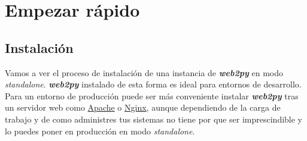 \documentclass[
  12pt,
  spanish,
]{article}
\begin{document}
\hypertarget{empezar-ruxe1pido}{%
\section{Empezar rápido}\label{empezar-ruxe1pido}}

\hypertarget{instalaciuxf3n}{%
\subsection{Instalación}\label{instalaciuxf3n}}

Vamos a ver el proceso de instalación de una instancia de
\textbf{\emph{web2py}} en modo \emph{standalone}. \textbf{\emph{web2py}}
instalado de esta forma es ideal para entornos de desarrollo. Para un
entorno de producción puede ser más conveniente instalar
\textbf{\emph{web2py}} tras un servidor web como
\href{https://www.apache.org/}{Apache} o
\href{https://www.nginx.com/}{Nginx}, aunque dependiendo de la carga de
trabajo y de como administres tus sistemas no tiene por que ser
imprescindible y lo puedes poner en producción en modo
\emph{standalone}.
\end{document}
